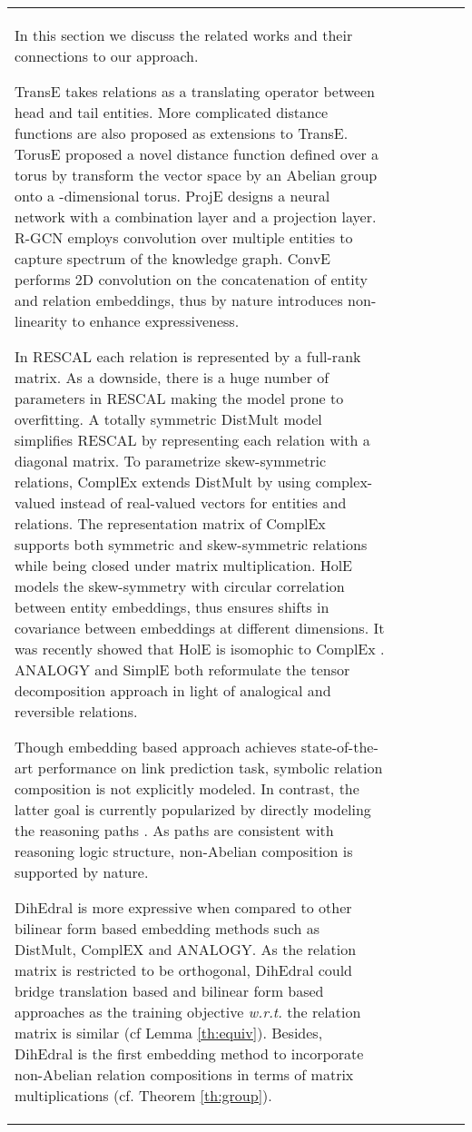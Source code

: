 \documentclass[11pt,a4paper]{article}
\begin{document}
\begin{table*}[ht]
\begin{tabular}{l|ccccc}
In this section we discuss the related works and their connections to our approach.

TransE \cite{transe} takes relations as a translating operator between head and tail entities. More complicated distance functions \cite{transh, transr, ptranse} are also proposed as extensions to TransE. TorusE \cite{torusE} proposed a novel distance function defined over a torus by transform the vector space by an Abelian group onto a -dimensional torus. ProjE \cite{proje} designs a neural network with a combination layer and a projection layer. R-GCN \cite{rgcn} employs convolution  over multiple entities to capture spectrum of the knowledge graph. ConvE \cite{convE} performs 2D convolution on the concatenation of entity and relation embeddings, thus by nature introduces non-linearity to enhance expressiveness. 

In RESCAL \cite{rescal} each relation is represented by a full-rank matrix. As a downside, there is a huge number of parameters in RESCAL making the model prone to overfitting.  A totally symmetric DistMult \cite{distmult} model simplifies RESCAL by representing each relation with a diagonal matrix. To parametrize skew-symmetric relations, ComplEx \cite{complex} extends DistMult by using complex-valued instead of real-valued vectors for entities and relations. The representation matrix of ComplEx supports both symmetric and skew-symmetric relations while being closed under matrix multiplication. HolE \cite{hole} models the skew-symmetry with circular correlation between entity embeddings, thus ensures shifts in covariance  between embeddings at different dimensions. It was recently showed that HolE is isomophic to ComplEx \cite{isomophic}. ANALOGY \cite{analogy} and SimplE \cite{simple} both reformulate the tensor decomposition approach in light of analogical and reversible relations.

Though embedding based approach achieves state-of-the-art performance on link prediction task, symbolic relation composition is not explicitly modeled. In contrast, the latter goal is currently popularized by directly modeling the reasoning paths \cite{composition_vectors, deeppath, minerva, multi_hop, longterm}. As paths are consistent with reasoning logic structure, non-Abelian composition is supported by nature. 


DihEdral is more expressive when compared to other bilinear form based embedding methods such as DistMult, ComplEX and ANALOGY. As the relation matrix is restricted to be orthogonal, DihEdral could bridge translation based and bilinear form based approaches as the training objective \textit{w.r.t.} the relation matrix is similar (cf Lemma \ref{th:equiv}). Besides, DihEdral is the first embedding method to incorporate non-Abelian relation compositions in terms of matrix multiplications (cf. Theorem \ref{th:group}).


\end{tabular}
\end{table*}
\end{document}
